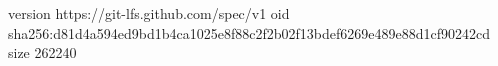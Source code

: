version https://git-lfs.github.com/spec/v1
oid sha256:d81d4a594ed9bd1b4ca1025e8f88c2f2b02f13bdef6269e489e88d1cf90242cd
size 262240
